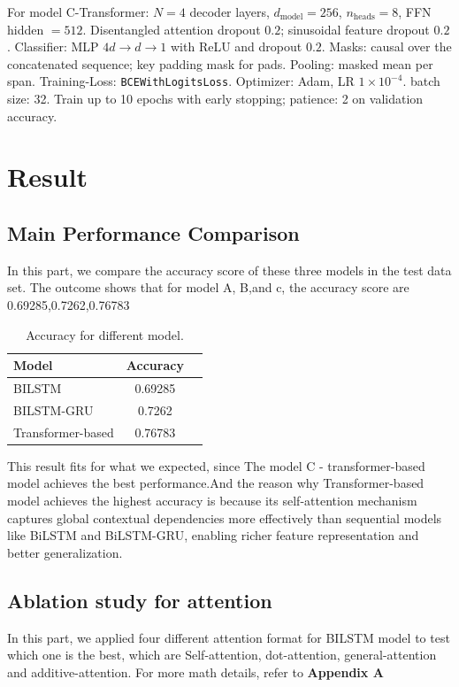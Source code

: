 \documentclass[11pt]{article}
\begin{document}
For model C-Transformer: $N{=}4$ decoder layers, $d_{\text{model}}{=}256$, $n_{\text{heads}}{=}8$, FFN hidden $=512$. Disentangled attention dropout $0.2$; sinusoidal feature dropout $0.2$. Classifier: MLP $4d \rightarrow d \rightarrow 1$ with ReLU and dropout $0.2$. Masks: causal over the concatenated sequence; key padding mask for pads. Pooling: masked mean per span.    Training-Loss: \texttt{BCEWithLogitsLoss}. Optimizer: Adam, LR $1{\times}10^{-4}$. batch size: 32. Train up to 10 epochs with early stopping; patience: 2 on validation accuracy. 

\section{Result}
\subsection {Main Performance Comparison}
In this part, we compare the accuracy score of these three models in the test data set. The outcome shows that for model A, B,and c, the accuracy score are 0.69285,0.7262,0.76783

\begin{table}[H]
  \centering
  \begin{tabular}{lcc}
    \hline
    \textbf{Model} & \textbf{Accuracy} \\
    \hline
    BILSTM & 0.69285  \\
    BILSTM-GRU & 0.7262 \\
    Transformer-based & 0.76783 \\
    \hline
  \end{tabular}
  \caption{Accuracy for different model.}
\end{table}
This result fits for what we expected, since The model C - transformer-based model achieves the best performance.And the reason why Transformer-based model achieves the highest accuracy is because its self-attention mechanism captures global contextual dependencies more effectively than sequential models like BiLSTM and BiLSTM-GRU, enabling richer feature representation and better generalization.
\subsection {Ablation study for attention}
In this part, we applied four different attention format for BILSTM model to test which one is the best, which are Self-attention, dot-attention, general-attention and additive-attention. For more math details, refer to \textbf{Appendix A}
\end{document}
